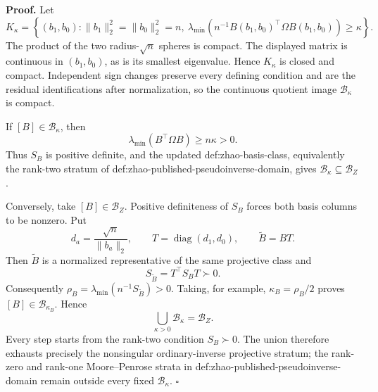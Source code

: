 \textbf{Proof.}
Let
\[
 K_\kappa=\left\{(b_1,b_0):
 \lVert b_1\rVert_2^2=\lVert b_0\rVert_2^2=n,
 \ \lambda_{\min}\!\left(n^{-1}B(b_1,b_0)^{\top}\Omega B(b_1,b_0)\right)\ge\kappa
 \right\}.
\]
The product of the two radius-\(\sqrt n\) spheres is compact.  The displayed matrix is continuous in \((b_1,b_0)\), as is its smallest eigenvalue.  Hence \(K_\kappa\) is closed and compact.  Independent sign changes preserve every defining condition and are the residual identifications after normalization, so the continuous quotient image \(\mathcal B_\kappa\) is compact.

If \([B]\in\mathcal B_\kappa\), then
\[
 \lambda_{\min}(B^{\top}\Omega B)\ge n\kappa>0.
\]
Thus \(S_B\) is positive definite, and the updated def:zhao-basis-class, equivalently the rank-two stratum of def:zhao-published-pseudoinverse-domain, gives \(\mathcal B_\kappa\subseteq\mathcal B_Z\).

Conversely, take \([B]\in\mathcal B_Z\).  Positive definiteness of \(S_B\) forces both basis columns to be nonzero.  Put
\[
 d_a=\frac{\sqrt n}{\lVert b_a\rVert_2},
 \qquad T=\operatorname{diag}(d_1,d_0),
 \qquad \widetilde B=BT.
\]
Then \(\widetilde B\) is a normalized representative of the same projective class and
\[
 S_{\widetilde B}=T^{\top}S_BT\succ0.
\]
Consequently \(\rho_B=\lambda_{\min}(n^{-1}S_{\widetilde B})>0\).  Taking, for example, \(\kappa_B=\rho_B/2\) proves \([B]\in\mathcal B_{\kappa_B}\).  Hence
\[
 \bigcup_{\kappa>0}\mathcal B_\kappa=\mathcal B_Z.
\]
Every step starts from the rank-two condition \(S_B\succ0\).  The union therefore exhausts precisely the nonsingular ordinary-inverse projective stratum; the rank-zero and rank-one Moore--Penrose strata in def:zhao-published-pseudoinverse-domain remain outside every fixed \(\mathcal B_\kappa\). \(\square\)
